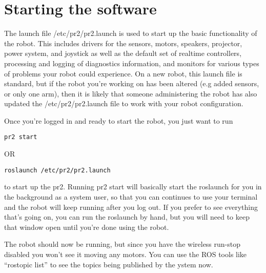 \section{Starting the software}
The launch file /etc/pr2/pr2.launch is used to start up the basic functionality of the robot.  This includes drivers for the sensors, motors, speakers, projector, power system, and joystick as well as the default set of realtime controllers, processing and logging of diagnostics information, and monitors for various types of problems your robot could experience.  On a new robot, this launch file is standard, but if the robot you're working on has been altered (e.g added sensors, or only one arm), then it is likely that someone administering the robot has also updated the /etc/pr2/pr2.launch file to work with your robot configuration.

Once you're logged in and ready to start the robot, you just want to run
\begin{verbatim}
pr2 start
\end{verbatim}
OR
\begin{verbatim}
roslaunch /etc/pr2/pr2.launch
\end{verbatim}
to start up the pr2.  Running pr2 start will basically start the roslaunch for you in the background as a system user, so that you can continues to use your terminal and the robot will keep running after you log out.  If you prefer to see everything that's going on, you can run the roslaunch by hand, but you will need to keep that window open until you're done using the robot. 

The robot should now be running, but since you have the wireless run-stop disabled you won't see it moving any motors.  You can use the ROS tools like ``rostopic list'' to see the topics being published by the ystem now.
